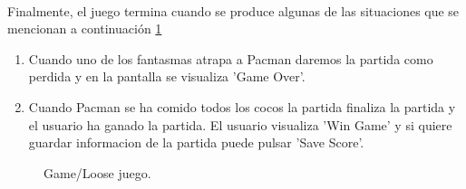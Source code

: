 \\Finalmente, el juego termina cuando se produce algunas de las situaciones que se mencionan a continuación  \ref{fig:Game/Loose game}
\begin{enumerate}
\item Cuando uno de los fantasmas atrapa a Pacman daremos la partida como perdida y en la pantalla se visualiza 'Game Over'.
\item Cuando Pacman se ha comido todos los cocos la partida finaliza la partida y el usuario ha ganado la partida. El usuario visualiza 'Win Game' y si quiere guardar informacion de la partida puede pulsar 'Save Score'.
\end{enumerate}
\begin{figure}[!h]
\centering
{}
\caption{Game/Loose juego.} \label{fig:Game/Loose game}
\end{figure}
